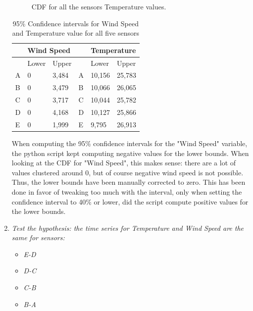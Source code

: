 \documentclass[a4paper,12pt]{article} %
\begin{document}
\begin{enumerate}
\begin{figure}[H]
    \caption{CDF for all the sensors Temperature values.} %
  \end{figure}
\begin{table}[H]
\centering
\begin{tabular}{|lll|ll|l|}
\hline
 & \multicolumn{2}{l}{Wind Speed} &  & \multicolumn{2}{l|}{Temperature} \\ \hline
\multicolumn{1}{|l|}{} & \multicolumn{1}{l|}{Lower} & Upper & \multicolumn{1}{l|}{} & Lower & Upper \\ \hline
\multicolumn{1}{|l|}{A} & \multicolumn{1}{l|}{0} & 3,484 & \multicolumn{1}{l|}{A} & 10,156 & 25,783 \\
\multicolumn{1}{|l|}{B} & \multicolumn{1}{l|}{0} & 3,479 & \multicolumn{1}{l|}{B} & 10,066 & 26,065 \\
\multicolumn{1}{|l|}{C} & \multicolumn{1}{l|}{0} & 3,717 & \multicolumn{1}{l|}{C} & 10,044 & 25,782 \\
\multicolumn{1}{|l|}{D} & \multicolumn{1}{l|}{0} & 4,168 & \multicolumn{1}{l|}{D} & 10,127 & 25,866 \\
\multicolumn{1}{|l|}{E} & \multicolumn{1}{l|}{0} & 1,999 & \multicolumn{1}{l|}{E} & 9,795 & 26,913 \\ \hline
\end{tabular}
\caption{95\% Confidence intervals for Wind Speed and Temperature value for all five sensors}
\label{tab:ci-table}
\end{table}
When computing the 95\% confidence intervals for the "Wind Speed" variable, the python script kept computing negative values for the lower bounds. When looking at the CDF for "Wind Speed", this makes sense: there are a lot of values clustered around 0, but of course negative wind speed is not possible. Thus, the lower bounds have been manually corrected to zero. This has been done in favor of tweaking too much with the interval, only when setting the confidence interval to 40\% or lower, did the script compute positive values for the lower bounds. 
\item{\it Test the hypothesis: the time series for Temperature and Wind Speed are the same for sensors:}
\begin{itemize}
    \item {\it E-D}
    \item {\it D-C}
    \item {\it C-B}
    \item {\it B-A}
\end{itemize}

\end{enumerate}
\end{document}
